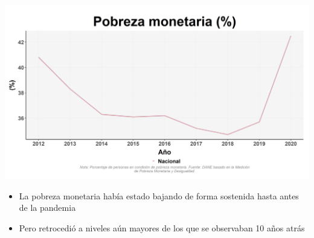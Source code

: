 \documentclass[aspectratio=169]{beamer}
\begin{document}
    \begin{slide}{4} 
            \begin{imagecolumn}
                \includegraphics[width=\columnwidth]{img/var_263_trend.png}
            \end{imagecolumn}
            \begin{textcolumn}
                \begin{itemize}
                    \item La pobreza monetaria había estado bajando de forma sostenida hasta antes de la pandemia
                    \item Pero retrocedió a niveles aún mayores de los que se observaban 10 años atrás
                \end{itemize}
            \end{textcolumn}

    \printcolumns
    \end{slide}
    
\end{document}
